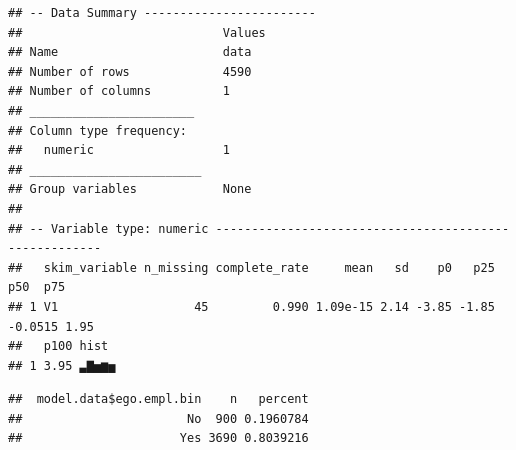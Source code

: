 \documentclass[
]{book}
\newenvironment{Shaded}{\begin{snugshade}}{\end{snugshade}}
\newcommand{\CommentTok}[1]{\textcolor[rgb]{0.56,0.35,0.01}{\textit{#1}}}
\newcommand{\DocumentationTok}[1]{\textcolor[rgb]{0.56,0.35,0.01}{\textbf{\textit{#1}}}}
\newcommand{\FunctionTok}[1]{\textcolor[rgb]{0.13,0.29,0.53}{\textbf{#1}}}
\newcommand{\NormalTok}[1]{#1}
\newcommand{\SpecialCharTok}[1]{\textcolor[rgb]{0.81,0.36,0.00}{\textbf{#1}}}
\begin{document}
\begin{Shaded}
\end{Shaded}

\begin{verbatim}
## -- Data Summary ------------------------
##                            Values
## Name                       data  
## Number of rows             4590  
## Number of columns          1     
## _______________________          
## Column type frequency:           
##   numeric                  1     
## ________________________         
## Group variables            None  
## 
## -- Variable type: numeric ------------------------------------------------------
##   skim_variable n_missing complete_rate     mean   sd    p0   p25     p50  p75
## 1 V1                   45         0.990 1.09e-15 2.14 -3.85 -1.85 -0.0515 1.95
##   p100 hist 
## 1 3.95 ▃▇▅▆▅
\end{verbatim}

\begin{Shaded}
\end{Shaded}

\begin{verbatim}
##  model.data$ego.empl.bin    n   percent
##                       No  900 0.1960784
##                      Yes 3690 0.8039216
\end{verbatim}

\begin{Shaded}
\end{Shaded}
\end{document}
